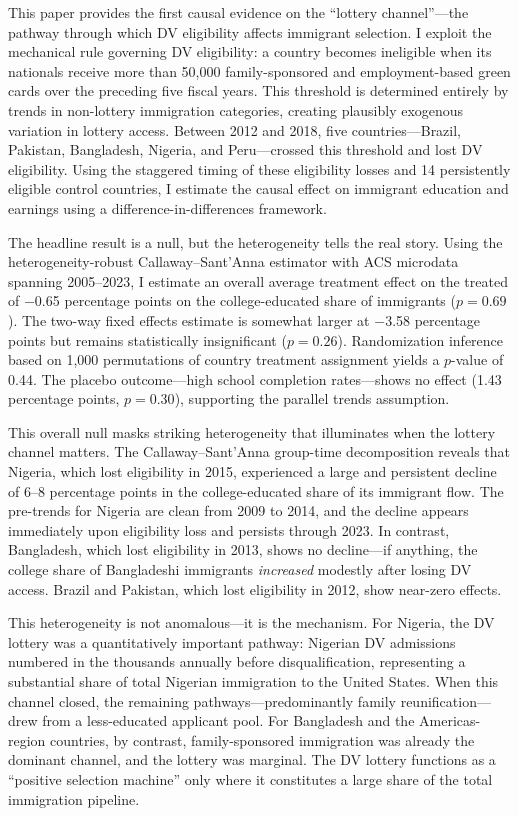 \documentclass[12pt]{article}
\begin{document}
This paper provides the first causal evidence on the ``lottery channel''---the pathway through which DV eligibility affects immigrant selection. I exploit the mechanical rule governing DV eligibility: a country becomes ineligible when its nationals receive more than 50,000 family-sponsored and employment-based green cards over the preceding five fiscal years. This threshold is determined entirely by trends in non-lottery immigration categories, creating plausibly exogenous variation in lottery access. Between 2012 and 2018, five countries---Brazil, Pakistan, Bangladesh, Nigeria, and Peru---crossed this threshold and lost DV eligibility. Using the staggered timing of these eligibility losses and 14 persistently eligible control countries, I estimate the causal effect on immigrant education and earnings using a difference-in-differences framework.

The headline result is a null, but the heterogeneity tells the real story. Using the heterogeneity-robust Callaway--Sant'Anna estimator \citep{CallawayS2021} with ACS microdata spanning 2005--2023, I estimate an overall average treatment effect on the treated of $-$0.65 percentage points on the college-educated share of immigrants ($p = 0.69$). The two-way fixed effects estimate is somewhat larger at $-$3.58 percentage points but remains statistically insignificant ($p = 0.26$). Randomization inference based on 1,000 permutations of country treatment assignment yields a $p$-value of 0.44. The placebo outcome---high school completion rates---shows no effect (1.43 percentage points, $p = 0.30$), supporting the parallel trends assumption.

This overall null masks striking heterogeneity that illuminates when the lottery channel matters. The Callaway--Sant'Anna group-time decomposition reveals that Nigeria, which lost eligibility in 2015, experienced a large and persistent decline of 6--8 percentage points in the college-educated share of its immigrant flow. The pre-trends for Nigeria are clean from 2009 to 2014, and the decline appears immediately upon eligibility loss and persists through 2023. In contrast, Bangladesh, which lost eligibility in 2013, shows no decline---if anything, the college share of Bangladeshi immigrants \textit{increased} modestly after losing DV access. Brazil and Pakistan, which lost eligibility in 2012, show near-zero effects.

This heterogeneity is not anomalous---it is the mechanism. For Nigeria, the DV lottery was a quantitatively important pathway: Nigerian DV admissions numbered in the thousands annually before disqualification, representing a substantial share of total Nigerian immigration to the United States. When this channel closed, the remaining pathways---predominantly family reunification---drew from a less-educated applicant pool. For Bangladesh and the Americas-region countries, by contrast, family-sponsored immigration was already the dominant channel, and the lottery was marginal. The DV lottery functions as a ``positive selection machine'' \citep{McKenzie2010} only where it constitutes a large share of the total immigration pipeline.
\end{document}
